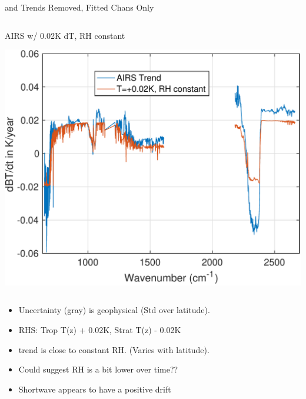 \documentclass[10pt,t]{beamer}
\begin{document}
\begin{frame}[label={sec:orga664b2b}]{\cd and \methane Trends Removed, Fitted Chans Only}
\begin{columns}
\begin{column}{0.55\columnwidth}
\begin{block}{\footnotesize AIRS w/ 0.02K dT, RH constant}
\vspace{-0.1in}
\begin{center}
\includegraphics[width=\linewidth]{./Figs/Pdf/dbt_constantRH_dsurf_dtrop=0.02k_dstrat=m0.02k_withAIRS.pdf}
\end{center}
\end{block}
\end{column}
\end{columns}

\begin{small}
\begin{itemize}
\item Uncertainty (gray) is geophysical (Std over latitude).
\item RHS: Trop T(z) + 0.02K, Strat T(z) - 0.02K
\item \water trend is close to constant RH. (Varies with latitude).
\item Could suggest RH is a bit lower over time??
\item Shortwave appears to have a positive drift
\end{itemize}
\end{small}
\end{frame}
\end{document}
